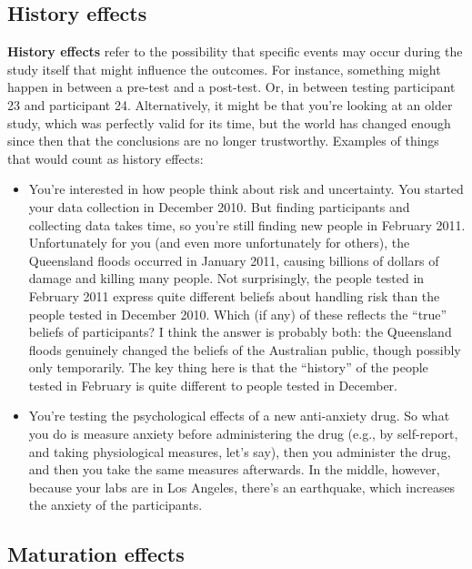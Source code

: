 \documentclass[
]{book}
\begin{document}
\subsection{History effects}\label{history-effects}

\textbf{History effects} refer to the possibility that specific events may occur during the study itself that might influence the outcomes. For instance, something might happen in between a pre-test and a post-test. Or, in between testing participant 23 and participant 24. Alternatively, it might be that you're looking at an older study, which was perfectly valid for its time, but the world has changed enough since then that the conclusions are no longer trustworthy. Examples of things that would count as history effects:

\begin{itemize}
\item
  You're interested in how people think about risk and uncertainty. You started your data collection in December 2010. But finding participants and collecting data takes time, so you're still finding new people in February 2011. Unfortunately for you (and even more unfortunately for others), the Queensland floods occurred in January 2011, causing billions of dollars of damage and killing many people. Not surprisingly, the people tested in February 2011 express quite different beliefs about handling risk than the people tested in December 2010. Which (if any) of these reflects the ``true'' beliefs of participants? I think the answer is probably both: the Queensland floods genuinely changed the beliefs of the Australian public, though possibly only temporarily. The key thing here is that the ``history'' of the people tested in February is quite different to people tested in December.
\item
  You're testing the psychological effects of a new anti-anxiety drug. So what you do is measure anxiety before administering the drug (e.g., by self-report, and taking physiological measures, let's say), then you administer the drug, and then you take the same measures afterwards. In the middle, however, because your labs are in Los Angeles, there's an earthquake, which increases the anxiety of the participants.
\end{itemize}

\subsection{Maturation effects}\label{maturation-effects}
\end{document}
